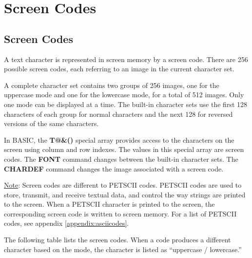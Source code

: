 \chapter{Screen Codes}

\section{Screen Codes}

\label{appendix:screencodes}

A text character is represented in screen memory by a screen code. There are 256 possible screen codes, each referring to an image in the current character set.

A complete character set contains two groups of 256 images, one for the uppercase mode and one for the lowercase mode, for a total of 512 images. Only one mode can be displayed at a time. The built-in character sets use the first 128 characters of each group for normal characters and the next 128 for reversed versions of the same characters.

In BASIC, the {\bf T@\&()} special array provides access to the characters on the screen using column and row indexes. The values in this special array are screen codes. The {\bf FONT} command changes between the built-in character sets. The {\bf CHARDEF} command changes the image associated with a screen code.

\underline{Note}: Screen codes are different to PETSCII codes. PETSCII codes are used to store, transmit, and receive textual data, and control the way strings are printed to the screen. When a PETSCII character is printed to the screen, the corresponding screen code is written to screen memory. For a list of PETSCII codes, see appendix \vref{appendix:asciicodes}.

The following table lists the screen codes. When a code produces a different character based on the mode, the character is listed as ``uppercase / lowercase.''

